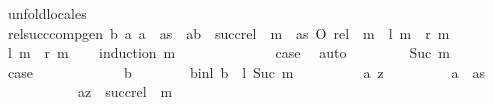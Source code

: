 \begin{isabellebody}
\ unfold{\isacharunderscore}{\kern0pt}locales%
\endisatagproof
{\isafoldproof}%
%
\isadelimproof
\isanewline
%
\endisadelimproof
\isanewline
\isanewline
{}\isamarkupfalse%
\ rel{\isacharunderscore}{\kern0pt}succ{\isacharunderscore}{\kern0pt}comp{\isacharunderscore}{\kern0pt}gen{\isacharcolon}{\kern0pt}\ {\isachardoublequoteopen}{\isacharbraceleft}{\kern0pt}b{\isachardot}{\kern0pt}\ {\isasymexists}a{\isachardot}{\kern0pt}\ a\ {\isasymin}\ as\ {\isasymand}\ {\isacharparenleft}{\kern0pt}a{\isacharcomma}{\kern0pt}b{\isacharparenright}{\kern0pt}\ {\isasymin}\ succ{\isacharunderscore}{\kern0pt}rel\ {\isacharcircum}{\kern0pt}{\isacharcircum}{\kern0pt}\ m{\isacharbraceright}{\kern0pt}\ {\isacharequal}{\kern0pt}\ as\ O\ rel\ {\isacharcircum}{\kern0pt}{\isacharcircum}{\kern0pt}\ m{\isachardoublequoteclose}\ {\isacharparenleft}{\kern0pt}\ {\isachardoublequoteopen}{\isacharquery}{\kern0pt}l\ m\ {\isacharequal}{\kern0pt}\ {\isacharquery}{\kern0pt}r\ m{\isachardoublequoteclose}{\isacharparenright}{\kern0pt}\isanewline
%
\isadelimproof
%
\endisadelimproof
%
\isatagproof
{}\isamarkupfalse%
\isanewline
\ \ \isamarkupfalse%
\ {\isachardoublequoteopen}{\isacharquery}{\kern0pt}l\ m\ {\isasymsubseteq}\ {\isacharquery}{\kern0pt}r\ m{\isachardoublequoteclose}\isanewline
\ \ \isamarkupfalse%
\ {\isacharparenleft}{\kern0pt}induction\ m{\isacharparenright}{\kern0pt}\isanewline
\ \ \ \ \isamarkupfalse%
\ {}\isanewline
\ \ \ \ \isamarkupfalse%
\ \isamarkupfalse%
\ {\isacharquery}{\kern0pt}case\ \isamarkupfalse%
\ auto\isanewline
\ \ \isamarkupfalse%
\isanewline
\ \ \ \ \isamarkupfalse%
\ {\isacharparenleft}{\kern0pt}Suc\ m{\isacharparenright}{\kern0pt}\isanewline
\ \ \ \ \isamarkupfalse%
\ {\isacharquery}{\kern0pt}case\isanewline
\ \ \ \ \isamarkupfalse%
\isanewline
\ \ \ \ \ \ \isamarkupfalse%
\ b\isanewline
\ \ \ \ \ \ \isamarkupfalse%
\ b{\isacharunderscore}{\kern0pt}in{\isacharunderscore}{\kern0pt}l{\isacharcolon}{\kern0pt}\ {\isachardoublequoteopen}b\ {\isasymin}\ {\isacharquery}{\kern0pt}l\ {\isacharparenleft}{\kern0pt}Suc\ m{\isacharparenright}{\kern0pt}{\isachardoublequoteclose}\isanewline
\ \ \ \ \ \ \isamarkupfalse%
\ \isamarkupfalse%
\ a\ z\isanewline
\ \ \ \ \ \ \ \ \ {\isachardoublequoteopen}a\ {\isasymin}\ as{\isachardoublequoteclose}\isanewline
\ \ \ \ \ \ \ \ \ \ \ {\isachardoublequoteopen}{\isacharparenleft}{\kern0pt}a{\isacharcomma}{\kern0pt}z{\isacharparenright}{\kern0pt}\ {\isasymin}\ succ{\isacharunderscore}{\kern0pt}rel\ {\isacharcircum}{\kern0pt}{\isacharcircum}{\kern0pt}\ m{\isachardoublequoteclose}\isanewline

\end{isabellebody}

